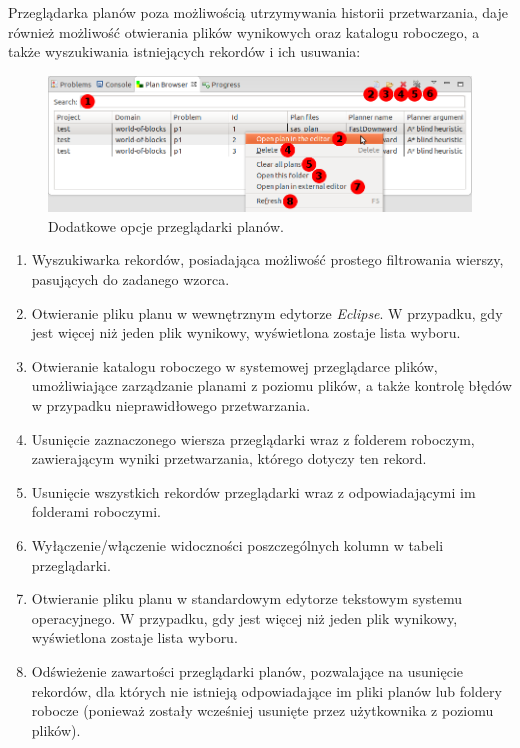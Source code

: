 Przeglądarka planów poza możliwością utrzymywania historii przetwarzania, daje również możliwość otwierania plików wynikowych oraz katalogu roboczego, a także wyszukiwania istniejących rekordów i ich usuwania:

\begin{figure}[h!]
    \centering
    \includegraphics[width=\textwidth]{img/plan_browser_options}
    \caption{Dodatkowe opcje przeglądarki planów.}
    \label{fig:plan_browser_options}
\end{figure}

\begin{enumerate}
\item Wyszukiwarka rekordów, posiadająca możliwość prostego filtrowania wierszy, pasujących do zadanego wzorca.
\item Otwieranie pliku planu w wewnętrznym edytorze \textit{Eclipse}. W przypadku, gdy jest więcej niż jeden plik wynikowy, wyświetlona zostaje lista wyboru.
\item Otwieranie katalogu roboczego w systemowej przeglądarce plików, umożliwiające zarządzanie planami z poziomu plików, a także kontrolę błędów w przypadku nieprawidłowego przetwarzania.
\item Usunięcie zaznaczonego wiersza przeglądarki wraz z folderem roboczym, zawierającym wyniki przetwarzania, którego dotyczy ten rekord.
\item Usunięcie wszystkich rekordów przeglądarki wraz z odpowiadającymi im folderami roboczymi.
\item Wyłączenie/włączenie widoczności poszczególnych kolumn w tabeli przeglądarki.
\item Otwieranie pliku planu w standardowym edytorze tekstowym systemu operacyjnego. W przypadku, gdy jest więcej niż jeden plik wynikowy, wyświetlona zostaje lista wyboru.
\item Odświeżenie zawartości przeglądarki planów, pozwalające na usunięcie rekordów, dla których nie istnieją odpowiadające im pliki planów lub foldery robocze (ponieważ zostały wcześniej usunięte przez użytkownika z poziomu plików).
\end{enumerate}

